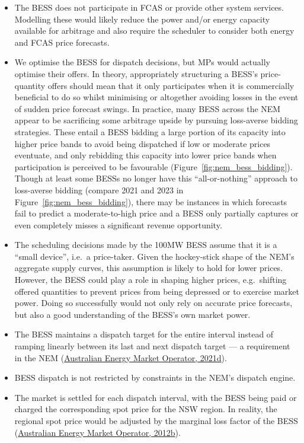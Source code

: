 \documentclass[12pt,a4paper,]{report}
\providecommand{\tightlist}{%
  \setlength{\itemsep}{0pt}\setlength{\parskip}{0pt}}
\begin{document}
\begin{itemize}
\tightlist
\item
  The BESS does not participate in FCAS or provide other system
  services. Modelling these would likely reduce the power and/or energy
  capacity available for arbitrage and also require the scheduler to
  consider both energy and FCAS price forecasts.
\item
  We optimise the BESS for dispatch decisions, but MPs would actually
  optimise their offers. In theory, appropriately structuring a BESS's
  price-quantity offers should mean that it only participates when it is
  commercially beneficial to do so whilst minimising or altogether
  avoiding losses in the event of sudden price forecast swings. In
  practice, many BESS across the NEM appear to be sacrificing some
  arbitrage upside by pursuing loss-averse bidding strategies. These
  entail a BESS bidding a large portion of its capacity into higher
  price bands to avoid being dispatched if low or moderate prices
  eventuate, and only rebidding this capacity into lower price bands
  when participation is perceived to be favourable
  (Figure~\ref{fig:nem_bess_bidding}). Though at least some BESSs no
  longer have this ``all-or-nothing'' approach to loss-averse bidding
  (compare 2021 and 2023 in Figure~\ref{fig:nem_bess_bidding}), there
  may be instances in which forecasts fail to predict a moderate-to-high
  price and a BESS only partially captures or even completely misses a
  significant revenue opportunity.
\item
  The scheduling decisions made by the 100MW BESS assume that it is a
  ``small device'', i.e.~a price-taker. Given the hockey-stick shape of
  the NEM's aggregate supply curves, this assumption is likely to hold
  for lower prices. However, the BESS could play a role in shaping
  higher prices, e.g.~shifting offered quantities to prevent prices from
  being depressed or to exercise market power. Doing so successfully
  would not only rely on accurate price forecasts, but also a good
  understanding of the BESS's own market power.
\item
  The BESS maintains a dispatch target for the entire interval instead
  of ramping linearly between its last and next dispatch target --- a
  requirement in the NEM
  (\protect\hyperlink{ref-australianenergymarketoperatorDispatchStandardOperating2019}{Australian
  Energy Market Operator, 2021d}).
\item
  BESS dispatch is not restricted by constraints in the NEM's dispatch
  engine.
\item
  The market is settled for each dispatch interval, with the BESS being
  paid or charged the corresponding spot price for the NSW region. In
  reality, the regional spot price would be adjusted by the marginal
  loss factor of the BESS
  (\protect\hyperlink{ref-aemoTreatmentLossFactors2012}{Australian
  Energy Market Operator, 2012b}).
\end{itemize}
\end{document}

